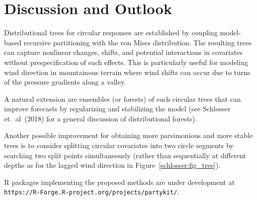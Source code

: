 \documentclass[twoside]{report}
\begin{document}
\section{Discussion and Outlook}

Distributional trees for circular responses are established by coupling
model-based recursive partitioning with the von Mises distribution.
The resulting trees can capture nonlinear changes, shifts, and potential interactions
in covariates without prespecification of such effects. This is particularly
useful for modeling wind direction in mountainous terrain where wind shifts
can occur due to turns of the pressure gradients along a valley.

A natural extension are ensembles (or forests) of such circular trees
that can improve forecasts by regularizing and stabilizing the model
(see Schlosser et.~al~(2018) for a general discussion of distributional forests). 

Another possible improvement for obtaining more parsimonious and more stable trees is to
consider splitting circular covariates into two circle segments by searching two
split points simultaneously (rather than sequentially at different depths as
for the lagged wind direction in Figure~\ref{schlosser:fig_tree}).

\textsf{R} packages implementing the proposed methods are under development at
\texttt{https://R-Forge.R-project.org/projects/partykit/}.


\bigskip


\bigskip
\end{document}
